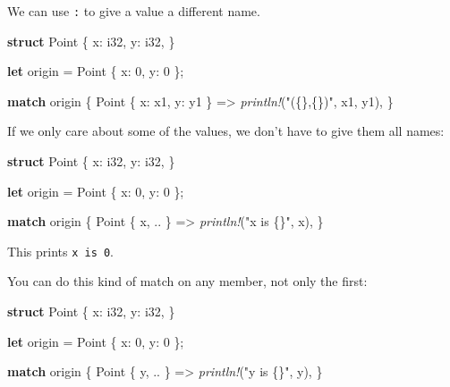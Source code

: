 \documentclass[a4paper,]{book}
\newenvironment{Shaded}{\begin{snugshade}}{\end{snugshade}}
\newcommand{\KeywordTok}[1]{\textcolor[rgb]{0.13,0.29,0.53}{\textbf{{#1}}}}
\newcommand{\DataTypeTok}[1]{\textcolor[rgb]{0.13,0.29,0.53}{{#1}}}
\newcommand{\DecValTok}[1]{\textcolor[rgb]{0.00,0.00,0.81}{{#1}}}
\newcommand{\StringTok}[1]{\textcolor[rgb]{0.31,0.60,0.02}{{#1}}}
\newcommand{\PreprocessorTok}[1]{\textcolor[rgb]{0.56,0.35,0.01}{\textit{{#1}}}}
\newcommand{\NormalTok}[1]{{#1}}
\begin{document}
We can use \texttt{:} to give a value a different name.

\begin{Shaded}
\begin{Highlighting}[]
\KeywordTok{struct} \NormalTok{Point \{}
    \NormalTok{x: }\DataTypeTok{i32}\NormalTok{,}
    \NormalTok{y: }\DataTypeTok{i32}\NormalTok{,}
\NormalTok{\}}

\KeywordTok{let} \NormalTok{origin = Point \{ x: }\DecValTok{0}\NormalTok{, y: }\DecValTok{0} \NormalTok{\};}

\KeywordTok{match} \NormalTok{origin \{}
    \NormalTok{Point \{ x: x1, y: y1 \} => }\PreprocessorTok{println!}\NormalTok{(}\StringTok{"(\{\},\{\})"}\NormalTok{, x1, y1),}
\NormalTok{\}}
\end{Highlighting}
\end{Shaded}

If we only care about some of the values, we don't have to give them all
names:

\begin{Shaded}
\begin{Highlighting}[]
\KeywordTok{struct} \NormalTok{Point \{}
    \NormalTok{x: }\DataTypeTok{i32}\NormalTok{,}
    \NormalTok{y: }\DataTypeTok{i32}\NormalTok{,}
\NormalTok{\}}

\KeywordTok{let} \NormalTok{origin = Point \{ x: }\DecValTok{0}\NormalTok{, y: }\DecValTok{0} \NormalTok{\};}

\KeywordTok{match} \NormalTok{origin \{}
    \NormalTok{Point \{ x, .. \} => }\PreprocessorTok{println!}\NormalTok{(}\StringTok{"x is \{\}"}\NormalTok{, x),}
\NormalTok{\}}
\end{Highlighting}
\end{Shaded}

This prints \texttt{x\ is\ 0}.

You can do this kind of match on any member, not only the first:

\begin{Shaded}
\begin{Highlighting}[]
\KeywordTok{struct} \NormalTok{Point \{}
    \NormalTok{x: }\DataTypeTok{i32}\NormalTok{,}
    \NormalTok{y: }\DataTypeTok{i32}\NormalTok{,}
\NormalTok{\}}

\KeywordTok{let} \NormalTok{origin = Point \{ x: }\DecValTok{0}\NormalTok{, y: }\DecValTok{0} \NormalTok{\};}

\KeywordTok{match} \NormalTok{origin \{}
    \NormalTok{Point \{ y, .. \} => }\PreprocessorTok{println!}\NormalTok{(}\StringTok{"y is \{\}"}\NormalTok{, y),}
\NormalTok{\}}
\end{Highlighting}
\end{Shaded}
\end{document}
